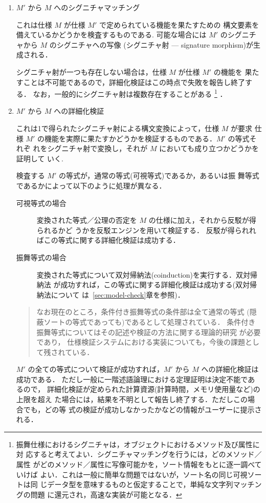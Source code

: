 \begin{enumerate}
\item $M'$ から $M$ へのシグニチャマッチング

  これは仕様 $M$ が仕様 $M'$ で定められている機能を果たすための
  構文要素を備えているかどうかを検査するものである.
  可能な場合には $M'$ のシグニチャから $M$ のシグニチャへの写像
  (シグニチャ射 --- signature morphism)が生成される．
  
  シグニチャ射が一つも存在しない場合は，仕様 $M$ が仕様 $M'$ の機能を
  果たすことは不可能であるので，詳細化検証はこの時点で失敗を報告し終了する．
  なお，一般的にシグニチャ射は複数存在することがある
  \footnote{
  振舞仕様におけるシグニチャは，オブジェクトにおけるメソッド及び属性に対
  応すると考えてよい．シグニチャマッチングを行うには，どのメソッド／属性
  がどのメソッド／属性に写像可能かを，ソート情報をもとに逐一調べていけば
  よい．これは一般に簡単な問題ではないが，ソート名の同じ可視ソートは同
  じデータ型を意味するものと仮定することで，単純な文字列マッチングの問題
  に還元され，高速な実装が可能となる．}
  ．

\item $M'$ から $M$ への詳細化検証

  これは1で得られたシグニチャ射による構文変換によって，仕様 $M$ が要求
  仕様 $M'$ の機能を実際に果たすかどうかを検証するものである．$M'$ の等式それぞ
  れをシグニチャ射で変換し，それが $M$ においても成り立つかどうかを証明して
  いく.

  検査する $M'$ の等式が，通常の等式(可視等式)であるか，あるいは振
  舞等式であるかによって以下のように処理が異なる．

  \begin{description}
  \item[可視等式の場合]
    変換された等式／公理の否定を $M$ の仕様に加え，それから反駁が得られるかど
    うかを反駁エンジンを用いて検証する．
    反駁が得られればこの等式に関する詳細化検証は成功する．

  \item[振舞等式の場合]
    変換された等式について双対帰納法(coinduction)を実行する．双対帰納法
    が成功すれば，この等式に関する詳細化検証は成功する(双対帰納法について
    は~\ref{sec:model-check}章を参照)．

  \end{description}

  \begin{quotation}
    なお現在のところ，条件付き振舞等式の条件部は全て通常の等式
    (隠蔽ソートの等式であっても)であるとして処理されている．
    条件付き振舞等式についてはその記述や検証の方法に関する理論的研究
    が必要であり，
    仕様検証システムにおける実装についても，今後の課題として残されている．
  \end{quotation}

  $M'$ の全ての等式について検証が成功すれば，$M'$ から
  $M$ への詳細化検証は成功である．
  ただし一般に一階述語論理における定理証明は決定不能であるので，
  詳細化検証が定められた計算資源(計算時間，メモリ使用量など)の上限を超え
  た場合には，結果を不明として報告し終了する．ただしこの場合でも，どの等
  式の検証が成功しなかったかなどの情報がユーザーに提示される．

\end{enumerate}

